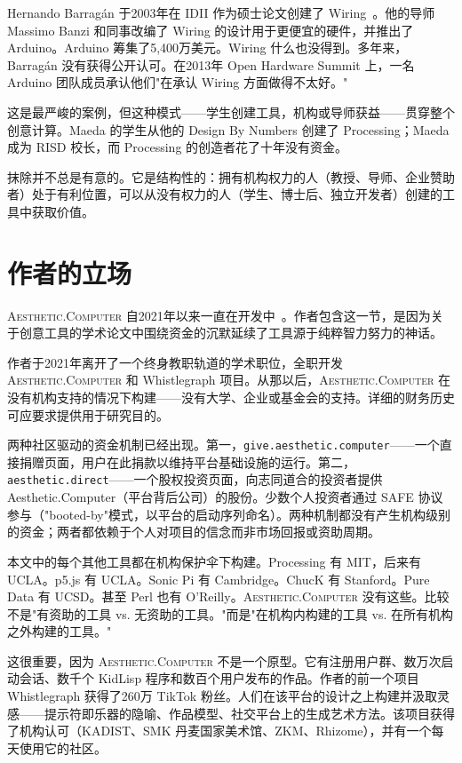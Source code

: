 \documentclass[10pt,letterpaper,twocolumn]{article}
\newcommand{\ac}{\textsc{Aesthetic.Computer}}
\begin{document}
Hernando Barrag\'an 于2003年在 IDII 作为硕士论文创建了 Wiring~\citep{barragan2004wiring}。他的导师 Massimo Banzi 和同事改编了 Wiring 的设计用于更便宜的硬件，并推出了 Arduino。Arduino 筹集了5,400万美元。Wiring 什么也没得到。多年来，Barrag\'an 没有获得公开认可。在2013年 Open Hardware Summit 上，一名 Arduino 团队成员承认他们"在承认 Wiring 方面做得不太好。"

这是最严峻的案例，但这种模式——学生创建工具，机构或导师获益——贯穿整个创意计算。Maeda 的学生从他的 Design By Numbers 创建了 Processing；Maeda 成为 RISD 校长，而 Processing 的创造者花了十年没有资金。

抹除并不总是有意的。它是结构性的：拥有机构权力的人（教授、导师、企业赞助者）处于有利位置，可以从没有权力的人（学生、博士后、独立开发者）创建的工具中获取价值。

\section{作者的立场}

\ac{} 自2021年以来一直在开发中~\citep{scudder2026ac}。作者包含这一节，是因为关于创意工具的学术论文中围绕资金的沉默延续了工具源于纯粹智力努力的神话。

作者于2021年离开了一个终身教职轨道的学术职位，全职开发 \ac{} 和 Whistlegraph 项目。从那以后，\ac{} 在没有机构支持的情况下构建——没有大学、企业或基金会的支持。详细的财务历史可应要求提供用于研究目的。

两种社区驱动的资金机制已经出现。第一，\texttt{give.aesthetic.computer}——一个直接捐赠页面，用户在此捐款以维持平台基础设施的运行。第二，\texttt{aesthetic.direct}——一个股权投资页面，向志同道合的投资者提供 Aesthetic.Computer（平台背后公司）的股份。少数个人投资者通过 SAFE 协议参与（"booted-by"模式，以平台的启动序列命名）。两种机制都没有产生机构级别的资金；两者都依赖于个人对项目的信念而非市场回报或资助周期。

本文中的每个其他工具都在机构保护伞下构建。Processing 有 MIT，后来有 UCLA。p5.js 有 UCLA。Sonic Pi 有 Cambridge。ChucK 有 Stanford。Pure Data 有 UCSD。甚至 Perl 也有 O'Reilly。\ac{} 没有这些。比较不是"有资助的工具 vs. 无资助的工具。"而是"在机构内构建的工具 vs. 在所有机构之外构建的工具。"

这很重要，因为 \ac{} 不是一个原型。它有注册用户群、数万次启动会话、数千个 KidLisp 程序和数百个用户发布的作品。作者的前一个项目 Whistlegraph 获得了260万 TikTok 粉丝。人们在该平台的设计之上构建并汲取灵感——提示符即乐器的隐喻、作品模型、社交平台上的生成艺术方法。该项目获得了机构认可（KADIST、SMK 丹麦国家美术馆、ZKM、Rhizome），并有一个每天使用它的社区。
\end{document}
